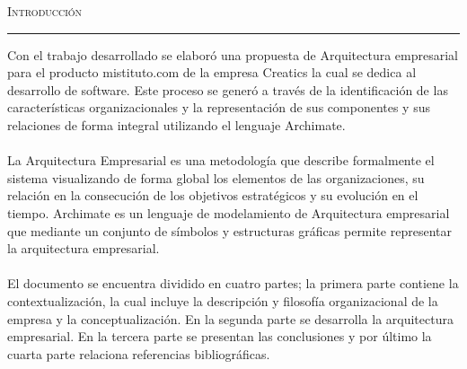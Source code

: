 \vspace*{3cm}
\noindent\Huge\textsc{Introducción}\\
\normalsize
\noindent\rule[2pt]{\textwidth}{0.8pt}
\hspace*{3cm}

Con el trabajo desarrollado se elaboró una propuesta de Arquitectura empresarial para el producto mistituto.com de la empresa Creatics la cual se dedica al desarrollo de software.  Este proceso se generó a través de la identificación de las características organizacionales y la representación de sus componentes y sus relaciones de forma integral utilizando el lenguaje Archimate. \\ \\

La Arquitectura Empresarial es una metodología que describe formalmente el sistema visualizando de forma global los elementos de las organizaciones, su relación en la consecución de los objetivos estratégicos y su evolución en el tiempo.
Archimate es un lenguaje de modelamiento de Arquitectura empresarial que mediante un conjunto de símbolos y estructuras gráficas permite representar la arquitectura empresarial. \\ \\

El documento se encuentra dividido en cuatro partes; la primera parte contiene la contextualización, la cual incluye la descripción y filosofía organizacional de la empresa y la conceptualización.  En la segunda parte se desarrolla la arquitectura empresarial. En la tercera parte se presentan las conclusiones y por último la cuarta parte relaciona referencias bibliográficas.